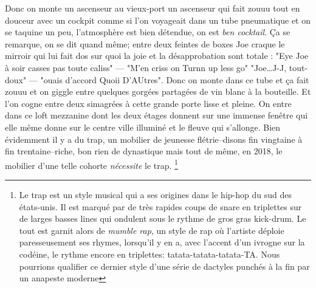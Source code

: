 Donc on monte un ascenseur au vieux-port un ascenseur qui fait zouuu tout en
douceur avec un cockpit comme si l'on voyageait dans un tube pneumatique et
on se taquine un peu, l'atmosphère est bien détendue, on est \emph{ben cocktail}.
Ça se remarque, on se dit quand même; entre deux feintes de boxes Joe
craque le mirroir qui lui fait dos sur quoi la joie et la désapprobation
sont totale : "Eye Joe à soir casses pas toute caliss" --- "M'en criss
on Turnn up less go" "Joe\ldots J-J, tout-doux" --- "ouais d'accord
Quoii D'AUtres".
Donc on monte dans ce tube et ça fait zouuu et on giggle entre quelques gorgées
partagées de vin blanc à la bouteille. Et l'on cogne entre deux simagrées à
cette grande porte lisse et pleine. On entre dans ce loft mezzanine dont
les deux étages donnent sur une immense fenêtre qui elle même donne sur le
centre ville illuminé et le fleuve qui s'allonge.  Bien évidemment il y a du
trap, un mobilier de jeunesse flétrie--disons fin vingtaine à fin
trentaine--riche, bon rien de dynastique mais tout de même, en 2018, le
mobilier d'une telle cohorte \emph{nécessite} le trap.  \footnote{Le trap est un style musical qui a ses origines dans le
        hip-hop du sud des états-unis. Il est marqué par de très rapides coups
        de snare en triplettes sur de larges basses lines qui ondulent sous le
        rythme de gros gras kick-drum.  Le tout est garnit alors de
        \textit{mumble rap}, un style de rap où l'artiste déploie paresseusement
        ses rhymes, lorsqu'il y en a, avec l'accent d'un ivrogne sur la codéine,
        le rythme encore en triplettes: tatata-tatata-tatata-TA.  Nous pourrions
        qualifier ce dernier style d'une série de dactyles punchés à la fin par
un anapeste moderne} 

